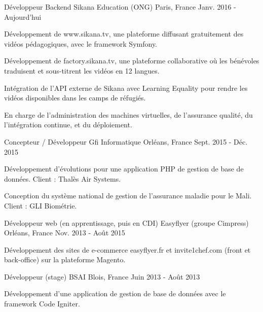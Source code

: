 \begin{cventries}
  \cventry
    {Développeur Backend}
    {Sikana Education (ONG)}
    {Paris, France}
    {Janv. 2016 - Aujourd'hui}
    {
      \begin{cvitems}
        \item {Développement de www.sikana.tv, une plateforme diffusant gratuitement des vidéos pédagogiques, avec le framework Symfony.}
        \item {Développement de factory.sikana.tv, une plateforme collaborative où les bénévoles traduisent et sous-titrent les vidéos en 12 langues.}
        \item {Intégration de l'API externe de Sikana avec Learning Equality pour rendre les vidéos disponibles dans les camps de réfugiés.}
        \item {En charge de l'administration des machines virtuelles, de l'assurance qualité, du l'intégration continue, et du déploiement.}
      \end{cvitems}
    }
  \cventry
    {Concepteur / Développeur}
    {Gfi Informatique}
    {Orléans, France}
    {Sept. 2015 - Déc. 2015}
    {
      \begin{cvitems}
        \item {Développement d'évolutions pour une application PHP de gestion de base de données. Client : Thalès Air Systems.}
        \item {Conception du système national de gestion de l'assurance maladie pour le Mali. Client : GLI Biométrie.}
      \end{cvitems}
    }
  \cventry
    {Développeur web (en apprentissage, puis en CDI)}
    {Easyflyer (groupe Cimpress)}
    {Orléans, France}
    {Nov. 2013 - Août 2015}
    {
      \begin{cvitems}
        \item {Développement des sites de e-commerce easyflyer.fr et invite1chef.com (front et back-office) sur la plateforme Magento.}
      \end{cvitems}
    }
  \cventry
    {Développeur (stage)}
    {BSAI}
    {Blois, France}
    {Juin 2013 - Août 2013}
    {
      \begin{cvitems}
        \item {Développement d'une application de gestion de base de données avec le framework Code Igniter.}
      \end{cvitems}
    }
\end{cventries}
